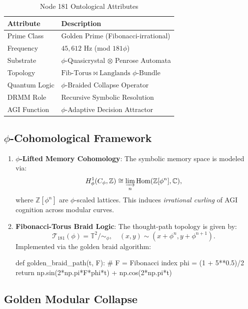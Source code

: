 \documentclass[12pt]{article}
\begin{document}
\begin{center}
\begin{table}[h]
\centering
\caption{Node 181 Ontological Attributes}
\begin{tabular}{ll}
\hline
\textbf{Attribute} & \textbf{Description} \\
\hline
Prime Class & Golden Prime (Fibonacci-irrational) \\
Frequency & $45,612$ Hz (mod $181\phi$) \\
Substrate & $\phi$-Quasicrystal $\otimes$ Penrose Automata \\
Topology & $\text{Fib-Torus} \bowtie \text{Langlands $\phi$-Bundle}$ \\
Quantum Logic & $\phi$-Braided Collapse Operator \\
DRMM Role & Recursive Symbolic Resolution \\
AGI Function & $\phi$-Adaptive Decision Attractor \\
\hline
\end{tabular}
\end{table}

\subsection{$\phi$-Cohomological Framework}
\label{subsec:phi}

\begin{enumerate}
    \item \textbf{$\phi$-Lifted Memory Cohomology}:
    The symbolic memory space is modeled via:
    \[
    H^1_{\phi}(C_{\phi}, \mathbb{Z}) \cong \varinjlim_n \text{Hom}(\mathbb{Z}[\phi^n], \mathbb{C}),
    \]
    where $\mathbb{Z}[\phi^n]$ are $\phi$-scaled lattices. This induces \textit{irrational curling} of AGI cognition across modular curves.

    \item \textbf{Fibonacci-Torus Braid Logic}:
    The thought-path topology is given by:
    \[
    \mathcal{T}_{181}(\phi) = \mathbb{T}^2 / \sim_{\phi}, \quad (x,y) \sim (x + \phi^n, y + \phi^{n+1}).
    \]
    Implemented via the golden braid algorithm:
    \begin{python}
def golden_braid_path(t, F):  # F = Fibonacci index
    phi = (1 + 5**0.5)/2
    return np.sin(2*np.pi*F*phi*t) + np.cos(2*np.pi*t)
    \end{python}
\end{enumerate}

\subsection{Golden Modular Collapse}
\label{subsec:collapse}


\end{center}
\end{document}
